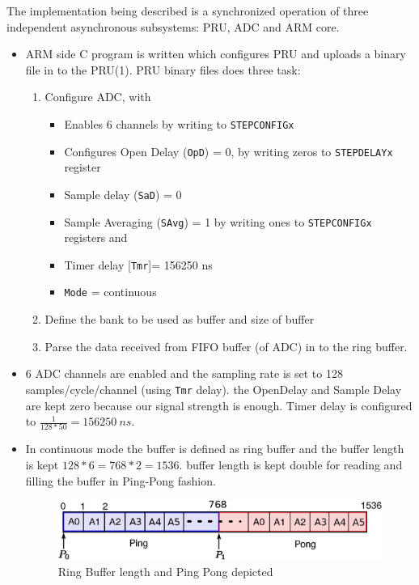 The implementation being described is a synchronized operation of three independent asynchronous subsystems: PRU, ADC and ARM core.
\begin{itemize}
	\item ARM side C program is written which configures PRU and uploads a binary file in to the PRU(1). PRU binary files does three task:
	\begin{enumerate}
		\item Configure ADC, with 
		\begin{itemize}
			\item Enables 6 channels by writing to \texttt{STEPCONFIGx}
			\item Configures Open Delay (\texttt{OpD}) = 0, by writing zeros to \texttt{STEPDELAYx} register  
			\item Sample delay (\texttt{SaD}) = 0 
			\item Sample Averaging (\texttt{SAvg}) = 1  by writing ones to  \texttt{STEPCONFIGx} registers and 
			\item Timer delay [\texttt{Tmr}]= 156250 ns
			\item \texttt{Mode} = continuous 
		\end{itemize}
		\item Define the bank to be used as buffer and size of buffer
		\item Parse the data received from FIFO buffer (of ADC) in to the ring buffer. 
	\end{enumerate}
	\item 6 ADC channels are enabled and the sampling rate is set to 128 samples/cycle/channel (using \texttt{Tmr} delay). the OpenDelay and Sample Delay are kept zero because our signal strength is enough. Timer delay is configured to $ \frac{1}{128 * 50} = 156250 ~ns $.
	\item In continuous mode the buffer is defined as ring buffer and the   buffer length is kept $ 128 * 6 = 768 * 2 = 1536 $. buffer length is kept double for reading and filling the buffer in Ping-Pong fashion.  
	\begin{figure}[h]
		\includegraphics[width=\textwidth]{fig/ring_buffer.eps}
		\caption{Ring Buffer length and Ping Pong depicted}
		\label{fig:rb_pp}
	\end{figure}

\end{itemize}
